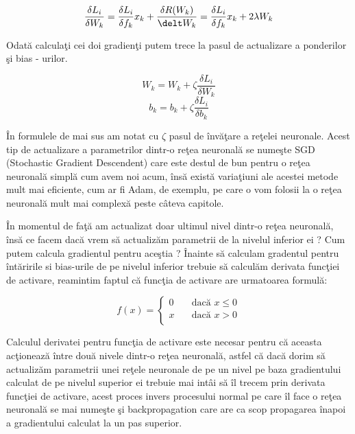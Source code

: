 $$\frac{\delta L_i}{\delta W_k} = \frac{\delta L_i}{\delta f_k} x_k + \frac{\delta R(W_k)}{\delt W_k} = \frac{\delta L_i}{\delta f_k} x_k + 2 \lambda W_k$$

Odat\u{a} calcula\c{t}i cei doi gradien\c{t}i putem trece la pasul de actualizare a ponderilor \c{s}i bias - urilor.

$$ W_k = W_k + \zeta \frac{\delta L_i}{\delta W_k} $$
$$b_k = b_k + \zeta \frac{\delta L_i}{\delta b_k} $$

\^{I}n formulele de mai sus am notat cu $\zeta$ pasul de \^{i}nv\u{a}\c{t}are a re\c{t}elei neuronale. Acest tip de actualizare a parametrilor dintr-o re\c{t}ea neuronal\u{a} se nume\c{s}te SGD (Stochastic Gradient Descendent) care este destul de bun pentru o re\c{t}ea neuronal\u{a} simpl\u{a} cum avem noi acum, \^{i}ns\u{a} exist\u{a} varia\c{t}iuni ale acestei metode mult mai eficiente, cum ar fi Adam, de exemplu, pe care o vom folosii la o re\c{t}ea neuronal\u{a} mult mai complex\u{a} peste c\^{a}teva capitole.

\par

\^{I}n momentul de fa\c{t}\u{a} am actualizat doar ultimul nivel dintr-o re\c{t}ea neuronal\u{a}, \^{i}ns\u{a} ce facem dac\u{a} vrem s\u{a} actualiz\u{a}m parametrii de la nivelul inferior ei ? Cum putem calcula gradientul pentru ace\c{s}tia ? \^{I}nainte s\u{a} calculam gradentul pentru \^{i}nt\u{a}ririle si bias-urile de pe nivelul inferior trebuie s\u{a} calcul\u{a}m derivata func\c{t}iei de activare, reamintim faptul c\u{a} func\c{t}ia de activare are urmatoarea formul\u{a}:

\[ f(x) =
  \begin{cases}
    0       & \quad \text{dac\u{a} } x \leq 0\\
    x  & \quad \text{dac\u{a} } x > 0\\
  \end{cases}
\]

Calculul derivatei pentru func\c{t}ia de activare este necesar pentru c\u{a} aceasta ac\c{t}ioneaz\u{a} \^{i}ntre dou\u{a} nivele dintr-o re\c{t}ea neuronal\u{a}, astfel c\u{a} dac\u{a} dorim s\u{a} actualiz\u{a}m parametrii unei re\c{t}ele neuronale de pe un nivel pe baza gradientului calculat de pe nivelul superior ei trebuie mai int\^{a}i s\u{a} \^{i}l trecem prin derivata func\c{t}iei de activare, acest proces invers procesului normal pe care \^{i}l face o re\c{t}ea neuronal\u{a} se mai nume\c{s}te \c{s}i backpropagation care are ca scop propagarea \^{i}napoi a gradientului calculat la un pas superior.

